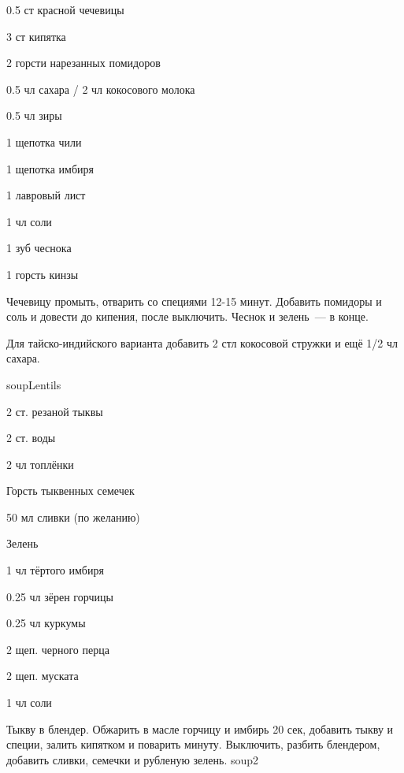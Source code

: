 


{
\item 0.5 ст красной чечевицы
\item 3 ст кипятка
\item 2 горсти нарезанных помидоров
}{
\item 0.5 чл сахара / 2 чл кокосового молока
\item 0.5 чл зиры
\item 1 щепотка чили
\item 1 щепотка имбиря
\item 1 лавровый лист
\item 1 чл соли
\item 1 зуб чеснока
\item 1 горсть кинзы
}{
Чечевицу промыть, отварить со специями 12-15 минут. Добавить помидоры и соль и довести до кипения, после выключить. Чеснок и зелень~--- в конце. %
}{
\begin{advice}
\item Для тайско-индийского варианта добавить 2 стл кокосовой стружки и ещё 1/2 чл сахара.
\end{advice}}{soupLentils}




{
\item 2 ст. резаной тыквы
\item 2 ст. воды
\item 2 чл топлёнки
\item Горсть тыквенных семечек 
\item 50 мл сливки (по желанию)
\item Зелень
}{
\item 1 чл тёртого имбиря
\item 0.25 чл зёрен горчицы
\item 0.25 чл куркумы
\item 2 щеп. черного перца
\item 2 щеп. муската
\item 1 чл соли
}
{
Тыкву в блендер. Обжарить в масле горчицу и имбирь 20 сек, добавить тыкву и специи, залить кипятком и поварить минуту. Выключить, разбить блендером, добавить сливки, семечки и рубленую зелень. 
}{}{soup2}

